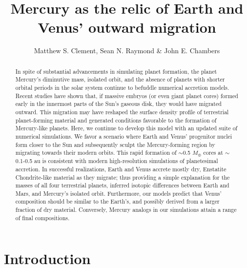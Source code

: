 \documentclass[trackchanges,twocolumn]{aastex}
\begin{document}

\title{Mercury as the relic of Earth and Venus' outward migration}


\author{Matthew S. Clement, Sean N. Raymond \& John E. Chambers}



\begin{abstract}

In spite of substantial advancements in simulating planet formation, the planet Mercury's diminutive mass, isolated orbit, and the absence of planets with shorter orbital periods in the solar system continue to befuddle numerical accretion models.  Recent studies have shown that, if massive embryos (or even giant planet cores) formed early in the innermost parts of the Sun's gaseous disk, they would have migrated outward.  This migration may have reshaped the surface density profile of terrestrial planet-forming material and generated conditions favorable to the formation of Mercury-like planets.  Here, we continue to develop this model with an updated suite of numerical simulations.  We favor a scenario where Earth and Venus' progenitor nuclei form closer to the Sun and subsequently sculpt the Mercury-forming region by migrating towards their modern orbits.  This rapid formation of $\sim$0.5 $M_{\oplus}$ cores at $\sim$0.1-0.5 au is consistent with modern high-resolution simulations of planetesimal accretion.  In successful realizations, Earth and Venus accrete mostly dry, Enstatite Chondrite-like material as they migrate; thus providing a simple explanation for the masses of all four terrestrial planets, inferred isotopic differences between Earth and Mars, and Mercury's isolated orbit.  Furthermore, our models predict that Venus' composition should be similar to the Earth's, and possibly derived from a larger fraction of dry material.  Conversely, Mercury analogs in our simulations attain a range of final compositions.

\end{abstract}

\section{Introduction}
\end{document}
